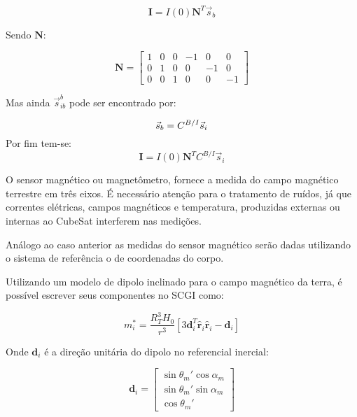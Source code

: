\begin{equation}
\mathbf{I}=I(0)\mathbf{N}^T\vec{s}_b
\end{equation}

Sendo $\mathbf{N}$:

\begin{equation}
\mathbf{N}=
\begin{bmatrix}
	1 & 0 & 0 & -1 & 0 & 0\\ 
	0 & 1 & 0 & 0 & -1 & 0\\ 
	0 & 0 & 1 & 0 & 0 & -1
\end{bmatrix}
\end{equation}

Mas ainda $\vec{s}^b_{ib}$ pode ser encontrado por:

\begin{equation}
\vec{s}_b=C^{B/I}\vec{s}_i\\
\end{equation}
Por fim tem-se:
\begin{equation}
\mathbf{I}=I(0)\mathbf{N}^T C^{B/I}\vec{s}_i
\end{equation}

O sensor magnético ou magnetômetro, fornece a medida do campo magnético terrestre em três eixos. É necessário atenção para o tratamento de ruídos, já que correntes elétricas, campos magnéticos e temperatura, produzidas externas ou internas ao CubeSat interferem nas medições.

Análogo ao caso anterior as medidas do sensor magnético serão dadas utilizando o sistema de referência o de coordenadas do corpo. 

Utilizando um modelo de dipolo inclinado para o campo magnético da terra, é possível escrever seus componentes no SCGI como:

\begin{equation}
m_i^* = \frac{R_T^3H_0}{r^3}\left [ 3\mathbf{d}_i^T\mathbf{\hat{r}}_i\mathbf{\hat{r}}_i-\mathbf{d}_i \right ]
\end{equation}

Onde $\mathbf{d}_i$ é a direção unitária do dipolo no referencial inercial:

\begin{equation}
\mathbf{d}_i=\begin{bmatrix} \sin\theta_m'\cos\alpha_m \\\sin\theta_m'\sin\alpha_m \\ \cos\theta_m'\end{bmatrix}
\end{equation}

